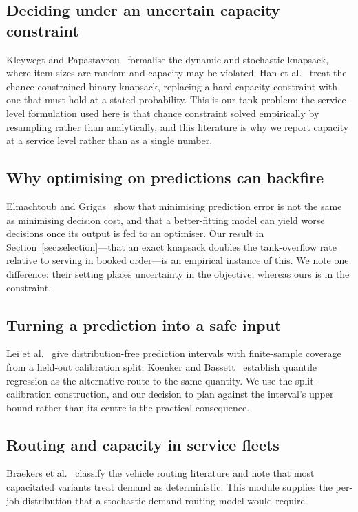 \documentclass[conference]{IEEEtran}
\begin{document}
\subsection{Deciding under an uncertain capacity constraint}
Kleywegt and Papastavrou~\cite{kleywegt1998dynamic,papastavrou1996deadlines} formalise the
dynamic and stochastic knapsack, where item sizes are random and capacity may be violated.
Han et al.~\cite{han2015chance} treat the chance-constrained binary knapsack, replacing a hard
capacity constraint with one that must hold at a stated probability. This is our tank problem:
the service-level formulation used here is that chance constraint solved empirically by
resampling rather than analytically, and this literature is why we report capacity at a
service level rather than as a single number.

\subsection{Why optimising on predictions can backfire}
Elmachtoub and Grigas~\cite{elmachtoub2022spo} show that minimising prediction error is not
the same as minimising decision cost, and that a better-fitting model can yield worse
decisions once its output is fed to an optimiser. Our result in
Section~\ref{sec:selection}---that an exact knapsack doubles the tank-overflow rate relative
to serving in booked order---is an empirical instance of this. We note one difference: their
setting places uncertainty in the objective, whereas ours is in the constraint.

\subsection{Turning a prediction into a safe input}
Lei et al.~\cite{lei2018conformal} give distribution-free prediction intervals with
finite-sample coverage from a held-out calibration split; Koenker and
Bassett~\cite{koenker1978quantiles} establish quantile regression as the alternative route to
the same quantity. We use the split-calibration construction, and our decision to plan
against the interval's upper bound rather than its centre is the practical consequence.

\subsection{Routing and capacity in service fleets}
Braekers et al.~\cite{braekers2016vrp} classify the vehicle routing literature and note that
most capacitated variants treat demand as deterministic. This module supplies the per-job
distribution that a stochastic-demand routing model would require.
\end{document}
